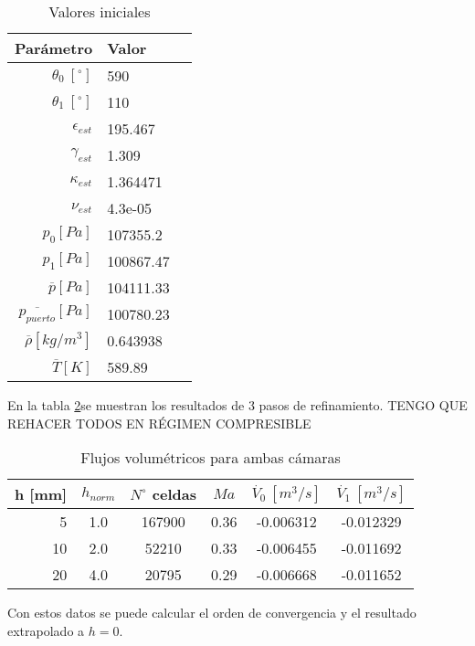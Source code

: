 \begin{table}
    \centering
    \begin{tabular}{rll}\toprule
        Parámetro & Valor \\ \midrule
        $\theta_0\ [^{\circ}]$ & 590 \\
        $\theta_1\ [^{\circ}]$ & 110 \\
        $\epsilon_{est}$ & 195.467 \\
        $\gamma_{est}$ & 1.309 \\
        $\kappa_{est}$ & 1.364471 \\
        $\nu_{est}$ & 4.3e-05 \\
        $p_0 [Pa]$ & 107355.2 \\
        $p_1 [Pa]$ & 100867.47 \\
        $\overline{p} [Pa]$ & 104111.33 \\
        $\overline{p_{puerto}} [Pa]$ & 100780.23 \\
        $\overline{\rho} [kg/m^3]$ & 0.643938 \\
        $\overline{T} [K]$ & 589.89 \\ \bottomrule
    \end{tabular}
    \caption{Valores iniciales}
    \label{tab:caso0_ci}
\end{table}


En la tabla \ref{tab:res_caso0}se muestran los resultados de 3 pasos de
refinamiento. TENGO QUE REHACER TODOS EN RÉGIMEN COMPRESIBLE

\begin{table}
    \centering
    \begin{tabular}{rccccc}\toprule
        h [mm] & $h_{norm}$ & $N^{\circ}$ celdas & $Ma$ & $\dot{V_{0}}\ [m^3/s] $ & $\dot{V_{1}}\ [m^3/s]$ \\ \midrule
        5      & 1.0        & 167900             & 0.36 & -0.006312     & -0.012329 \\
        10     & 2.0        & 52210              & 0.33 & -0.006455     & -0.011692 \\
        20     & 4.0        & 20795              & 0.29 & -0.006668     & -0.011652 \\ \bottomrule
    \end{tabular}
    \caption{Flujos volumétricos para ambas cámaras}
    \label{tab:res_caso0}
\end{table}

Con estos datos se puede calcular el orden de convergencia y el resultado
extrapolado a $h=0$.

